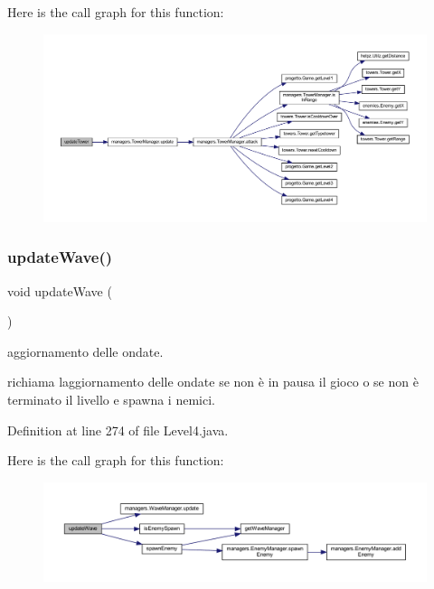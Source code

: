Here is the call graph for this function\+:
\nopagebreak
\begin{figure}[H]
\begin{center}
\leavevmode
\includegraphics[width=350pt]{classscenes_1_1_level4_ae4fd4a959e4d782a5e7ac0eff77ba27f_cgraph}
\end{center}
\end{figure}
\mbox{\label{classscenes_1_1_level4_ab424ab29e7ab4733f2efd1e6ef3f13b1}} 
\subsubsection{\texorpdfstring{update\+Wave()}{updateWave()}}
{\footnotesize\ttfamily void update\+Wave (\begin{DoxyParamCaption}{ }\end{DoxyParamCaption})}



aggiornamento delle ondate. 

richiama l\textquotesingle{}aggiornamento delle ondate se non è in pausa il gioco o se non è terminato il livello e spawna i nemici. 

Definition at line 274 of file Level4.\+java.

Here is the call graph for this function\+:
\nopagebreak
\begin{figure}[H]
\begin{center}
\leavevmode
\includegraphics[width=350pt]{classscenes_1_1_level4_ab424ab29e7ab4733f2efd1e6ef3f13b1_cgraph}
\end{center}
\end{figure}


